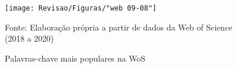 \begin{figure}[htp!]
	\centering
	\caption{Palavras-chave mais populares na WoS}
	\label{fig:web-09-08}
	\texttt{[image: Revisao/Figuras/"web 09-08"]}
	
	
	\vspace{0.2cm}
	Fonte: Elaboração própria a partir de dados da Web of Science (2018 a 2020)
\end{figure}